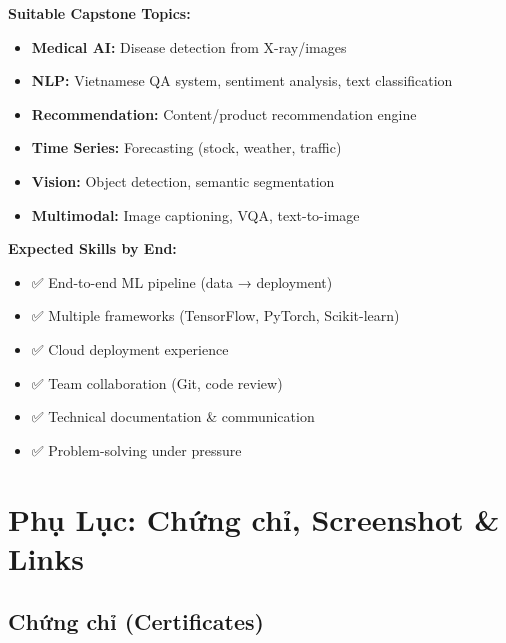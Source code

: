 \documentclass[12pt,a4paper]{article}
\begin{document}
\textbf{Suitable Capstone Topics:}
\begin{itemize}
    \item \textbf{Medical AI:} Disease detection from X-ray/images
    \item \textbf{NLP:} Vietnamese QA system, sentiment analysis, text classification
    \item \textbf{Recommendation:} Content/product recommendation engine
    \item \textbf{Time Series:} Forecasting (stock, weather, traffic)
    \item \textbf{Vision:} Object detection, semantic segmentation
    \item \textbf{Multimodal:} Image captioning, VQA, text-to-image
\end{itemize}

\textbf{Expected Skills by End:}
\begin{itemize}
    \item ✅ End-to-end ML pipeline (data → deployment)
    \item ✅ Multiple frameworks (TensorFlow, PyTorch, Scikit-learn)
    \item ✅ Cloud deployment experience
    \item ✅ Team collaboration (Git, code review)
    \item ✅ Technical documentation \& communication
    \item ✅ Problem-solving under pressure
\end{itemize}

\newpage


\appendix

\section{Phụ Lục: Chứng chỉ, Screenshot \& Links}

\subsection{Chứng chỉ (Certificates)}
\end{document}
